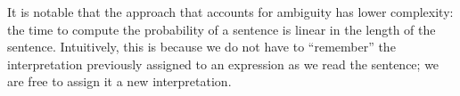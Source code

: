 \documentclass[11pt]{article}
\theoremstyle{definition}
\begin{document}
It is notable that the approach that accounts for ambiguity has lower complexity: the time to compute the probability of a sentence is linear in the length of the sentence. Intuitively, this is because we do not have to ``remember'' the interpretation previously assigned to an expression as we read the sentence; we are free to assign it a new interpretation.






\end{document}
